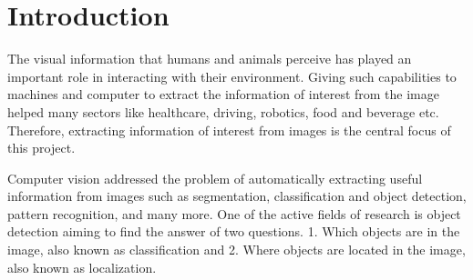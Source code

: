 \documentclass[journal,onecolumn,12pt]{IEEEtran}
\begin{document}
\section{Introduction}
The visual information that humans and animals perceive has played an important role in interacting with their environment. Giving such capabilities to machines and computer to extract the information of interest from the image helped many sectors like healthcare, driving, robotics, food and beverage etc. Therefore, extracting information of interest from images is the central focus of this project.

Computer vision addressed the problem of automatically extracting useful information from images such as segmentation, classification and object detection, pattern recognition, and many more. One of the active fields of research is object detection aiming to find the answer of two questions. 1. Which objects are in the image, also known as classification and 2. Where objects are located in the image, also known as localization.
\end{document}
